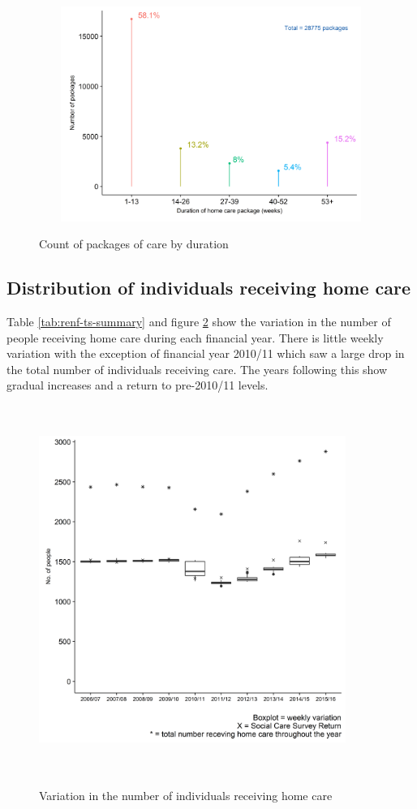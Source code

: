 \documentclass[]{article}
\begin{document}
\begin{figure}[]
  \centering
    \caption{Count of packages of care by duration}
    \includegraphics[height = 7cm, width = 12cm]{figures/chapter-renf/04-duration-plot.png}
    \label{fig:ren-duration}
\end{figure}

\FloatBarrier

\subsection{Distribution of individuals receiving home care}\label{renf-results-ts}

Table \ref{tab:renf-ts-summary} and figure \ref{fig:renf-hrs} show the
variation in the number of people receiving home care during each
financial year. There is little weekly variation with the exception of
financial year 2010/11 which saw a large drop in the total number of
individuals receiving care. The years following this show gradual
increases and a return to pre-2010/11 levels.

\begin{figure}[]
  \centering
    \caption{Variation in the number of individuals receiving home care}
    \includegraphics[width = 10cm, height = 12cm]{figures/chapter-renf/05-indivdual-weekly-variation.png}
    \label{fig:renf-hrs}
\end{figure}
\end{document}
